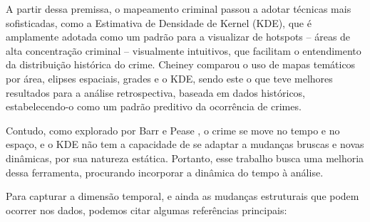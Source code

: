 A partir dessa premissa, o mapeamento criminal passou a adotar técnicas mais sofisticadas, como a Estimativa de Densidade de Kernel (KDE), que é amplamente adotada como um padrão para a visualizar de hotspots -- áreas de alta concentração criminal -- visualmente intuitivos, que facilitam o entendimento da distribuição histórica do crime. Cheiney \cite{Chainey2008} comparou o uso de mapas temáticos por área, elipses espaciais, grades e o KDE, sendo este o que teve melhores resultados para a análise retrospectiva, baseada em dados históricos, estabelecendo-o como um padrão preditivo da ocorrência de crimes.

Contudo, como explorado por Barr e Pease \cite{Barr1990}, o crime se move no tempo e no espaço, e o KDE não tem a capacidade de se adaptar a mudanças bruscas e novas dinâmicas, por sua natureza estática. Portanto, esse trabalho busca uma melhoria dessa ferramenta, procurando incorporar a dinâmica do tempo à análise.

Para capturar a dimensão temporal, e ainda as mudanças estruturais que podem ocorrer nos dados, podemos citar algumas referências principais:

